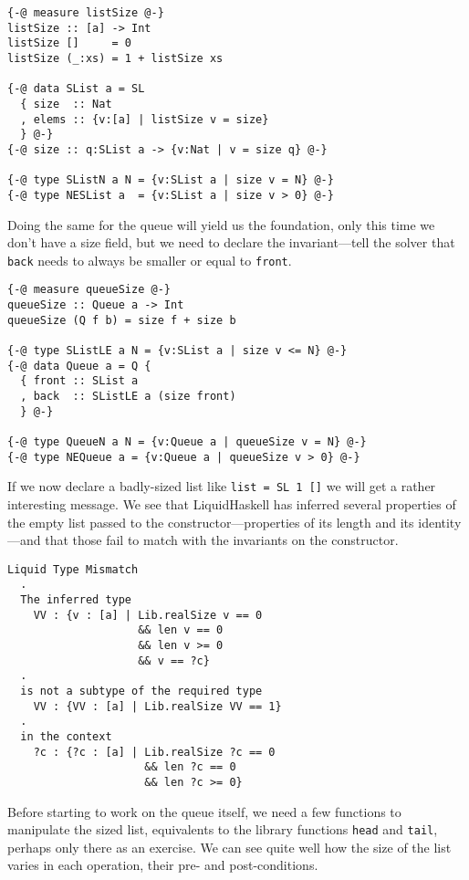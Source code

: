 \documentclass[11pt]{article}
\begin{document}
\begin{verbatim}
{-@ measure listSize @-}
listSize :: [a] -> Int
listSize []     = 0
listSize (_:xs) = 1 + listSize xs

{-@ data SList a = SL
  { size  :: Nat
  , elems :: {v:[a] | listSize v = size}
  } @-}
{-@ size :: q:SList a -> {v:Nat | v = size q} @-}

{-@ type SListN a N = {v:SList a | size v = N} @-}
{-@ type NESList a  = {v:SList a | size v > 0} @-}
\end{verbatim}

Doing the same for the queue will yield us the foundation, only this time we
don't have a size field, but we need to declare the invariant---tell the solver
that \texttt{back} needs to always be smaller or equal to \texttt{front}.

\begin{verbatim}
{-@ measure queueSize @-}
queueSize :: Queue a -> Int
queueSize (Q f b) = size f + size b

{-@ type SListLE a N = {v:SList a | size v <= N} @-}
{-@ data Queue a = Q {
  { front :: SList a
  , back  :: SListLE a (size front)
  } @-}

{-@ type QueueN a N = {v:Queue a | queueSize v = N} @-}
{-@ type NEQueue a = {v:Queue a | queueSize v > 0} @-}
\end{verbatim}

If we now declare a badly-sized list like \texttt{list = SL 1 []} we will get a rather
interesting message. We see that LiquidHaskell has inferred several properties
of the empty list passed to the constructor---properties of its length and its
identity---and that those fail to match with the invariants on the constructor.

\begin{verbatim}
Liquid Type Mismatch
  .
  The inferred type
    VV : {v : [a] | Lib.realSize v == 0
                    && len v == 0
                    && len v >= 0
                    && v == ?c}
  .
  is not a subtype of the required type
    VV : {VV : [a] | Lib.realSize VV == 1}
  .
  in the context
    ?c : {?c : [a] | Lib.realSize ?c == 0
                     && len ?c == 0
                     && len ?c >= 0}
\end{verbatim}

Before starting to work on the queue itself, we need a few functions to
manipulate the sized list, equivalents to the library functions \texttt{head} and \texttt{tail},
perhaps only there as an exercise. We can see quite well how the size of the
list varies in each operation, their pre- and post-conditions.
\end{document}
